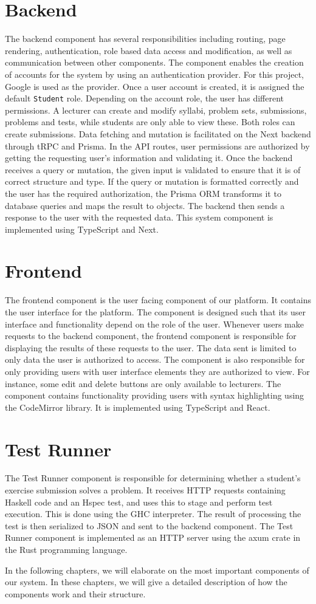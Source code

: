 \section{Backend}
The backend component has several responsibilities including routing, page rendering, authentication, role based data access and modification, as well as communication between other components.
The component enables the creation of accounts for the system by using an authentication provider.
For this project, Google is used as the provider.
Once a user account is created, it is assigned the default \texttt{Student} role.
Depending on the account role, the user has different permissions.
A lecturer can create and modify syllabi, problem sets, submissions, problems and tests, while students are only able to view these. Both roles can create submissions.
Data fetching and mutation is facilitated on the Next backend through tRPC and Prisma. In the API routes, user permissions are authorized by getting the requesting user's information and validating it.
Once the backend receives a query or mutation, the given input is validated to ensure that it is of correct structure and type.
If the query or mutation is formatted correctly and the user has the required authorization, the Prisma ORM transforms it to database queries and maps the result to \javascript{} objects.
The backend then sends a response to the user with the requested data.
This system component is implemented using TypeScript and Next.

\section{Frontend} \label{sec:architecture-frontend}
The frontend component is the user facing component of our platform.  It contains the user interface for the platform.
The component is designed such that its user interface and functionality depend on the role of the user.
Whenever users make requests to the backend component, the frontend component is responsible for displaying the results of these requests to the user. The data sent is limited to only data the user is authorized to access.
The component is also responsible for only providing users with user interface elements they are authorized to view.
For instance, some edit and delete buttons are only available to lecturers.
The component contains functionality providing users with syntax highlighting using the CodeMirror library.
It is implemented using TypeScript and React.

\section{Test Runner}
The Test Runner component is responsible for determining whether a student's exercise submission solves a problem.
It receives HTTP requests containing Haskell code and an Hspec test, and uses this to stage and perform test execution.
This is done using the GHC interpreter.
The result of processing the test is then serialized to JSON and sent to the backend component.
The Test Runner component is implemented as an HTTP server using the axum crate in the Rust programming language.

In the following chapters, we will elaborate on the most important components of our system. In these chapters, we will give a detailed description of how the components work and their structure.